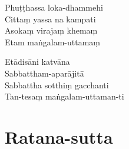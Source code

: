 \begin{paritta}
Phuṭṭhassa loka-dhammehi\\
Cittaṃ yassa na kampati\\
Asokaṃ virajaṃ khemaṃ\\
Etam maṅgalam-uttamaṃ

Etādisāni katvāna\\
Sabbattham-aparājitā\\
Sabbattha sotthiṃ gacchanti\\
Tan-tesaṃ maṅgalam-uttaman-ti

\end{paritta}

\clearpage

\chapter{Ratana-sutta}%


